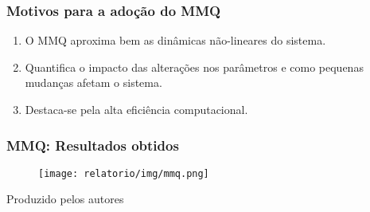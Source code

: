 \begin{frame}
    \frametitle{Motivos para a adoção do MMQ}
    \begin{enumerate}
        \item O MMQ aproxima bem as dinâmicas não-lineares do sistema.
        \item Quantifica o impacto das alterações nos parâmetros e como pequenas mudanças afetam o sistema.
        \item Destaca-se pela alta eficiência computacional.
    \end{enumerate}
\end{frame}


\begin{frame}
    \frametitle{MMQ: Resultados obtidos}
    \begin{figure}
        \centering
        \texttt{[image: relatorio/img/mmq.png]}
    \end{figure}

    \vspace{0.2cm}

        \begin{center}
        {\tiny Produzido pelos autores}
    \end{center}
    
\end{frame}

